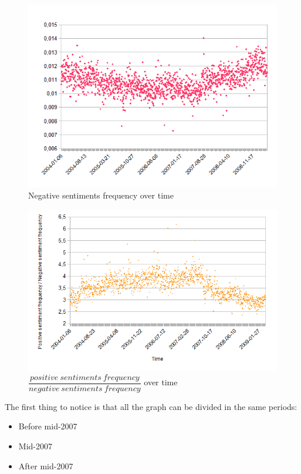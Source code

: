 \documentclass[12pt]{report}
\begin{document}
			\begin{figure}[h]
				\caption{Negative sentiments frequency over time\label{neg}}
				\includegraphics{plots/neg.png}
			\end{figure}
			
			\begin{figure}[h]
				\caption{$\dfrac{positive\ sentiments\ frequency}{negative\ sentiments\ frequency}$ over time\label{posdivneg}}
				\includegraphics{plots/posdivneg.png}
			\end{figure}
			
			The first thing to notice is that all the graph can be divided in the same periods:
			\begin{itemize}
				\item Before mid-2007
				\item Mid-2007
				\item After mid-2007
			\end{itemize}
\end{document}
